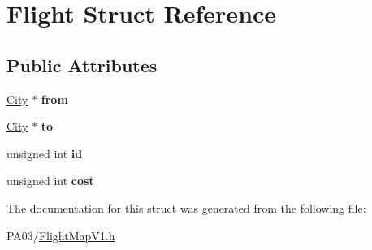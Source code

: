 \hypertarget{struct_flight}{}\section{Flight Struct Reference}
\label{struct_flight}
\subsection*{Public Attributes}
\begin{DoxyCompactItemize}
\item 
\mbox{\label{struct_flight_a45994169634d41a3cba0ef3f82a310cf}} 
\hyperlink{struct_city}{City} $\ast$ {\bfseries from}
\item 
\mbox{\label{struct_flight_acee86403e1e6d34a0628e2c1c3fbdd20}} 
\hyperlink{struct_city}{City} $\ast$ {\bfseries to}
\item 
\mbox{\label{struct_flight_ad7cb8fe9fb5a10fdf93bcee584ab0a81}} 
unsigned int {\bfseries id}
\item 
\mbox{\label{struct_flight_adaa8474cfffc5e01c12c17c6839899bc}} 
unsigned int {\bfseries cost}
\end{DoxyCompactItemize}


The documentation for this struct was generated from the following file\+:\begin{DoxyCompactItemize}
\item 
P\+A03/\hyperlink{_flight_map_v1_8h}{Flight\+Map\+V1.\+h}\end{DoxyCompactItemize}
